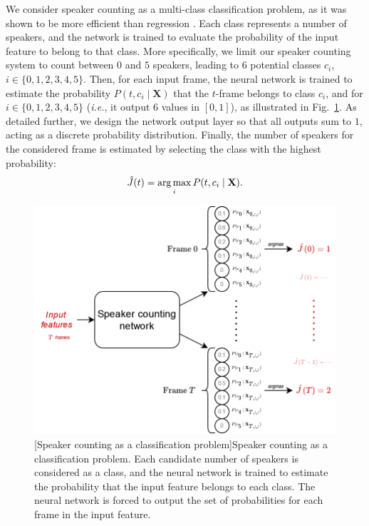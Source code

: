 We consider speaker counting as a multi-class classification problem, as it was shown to be more efficient than regression \cite{stoter_classification_2018}. Each class represents a number of speakers, and the network is trained to evaluate the probability of the input feature to belong to that class. More specifically, we limit our speaker counting system to count between $0$ and $5$ speakers, leading to $6$ potential classes $c_i$, $i \in \{0,1,2,3,4,5\}$. Then, for each input frame, the neural network is trained to estimate the probability $P(t,c_i \mid \mathbf{X})$ that the $t$-frame belongs to class $c_i$, and for $i \in \{0,1,2,3,4,5\}$ (\emph{i.e.}, it output $6$ values in $[0,1]$), as illustrated in Fig.~\ref{fig:countingClassification}. As detailed further, we design the network output layer so that all outputs sum to $1$, acting as a discrete probability distribution. Finally, the number of speakers for the considered frame is estimated by selecting the class with the highest probability:
\begin{equation}
    \hat{J}(t) = \operatorname*{arg\,max}_i P(t,c_i \mid \mathbf{X}).
\end{equation}
 
\begin{figure}[t]
    \begin{center}
    \includegraphics[width=0.9\linewidth]{Images/chap5/countingClassification.png}
    [Speaker counting as a classification problem]{Speaker counting as a classification problem. Each candidate number of speakers is considered as a class, and the neural network is trained to estimate the probability that the input feature belongs to each class. The neural network is forced to output the set of probabilities for each frame in the input feature.}
    \label{fig:countingClassification}
    \end{center}
\end{figure}

